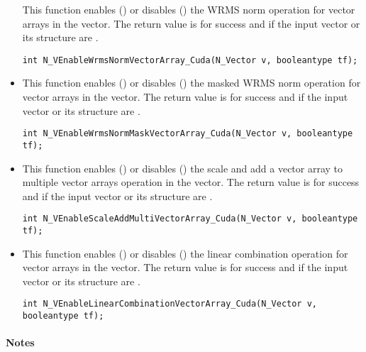 \begin{itemize}
This function enables () or disables () the WRMS norm
operation for vector arrays in the {\cuda} vector. The return value is  for
success and  if the input vector or its  structure are .

\verb|int N_VEnableWrmsNormVectorArray_Cuda(N_Vector v, booleantype tf);|


\item {}

This function enables () or disables () the masked WRMS
norm operation for vector arrays in the {\cuda} vector. The return value is
 for success and  if the input vector or its  structure are
.

\verb|int N_VEnableWrmsNormMaskVectorArray_Cuda(N_Vector v, booleantype tf);|


\item {}

This function enables () or disables () the scale and
add a vector array to multiple vector arrays operation in the {\cuda} vector. The
return value is  for success and  if the input vector or its
 structure are .

\verb|int N_VEnableScaleAddMultiVectorArray_Cuda(N_Vector v, booleantype tf);|


\item {}

This function enables () or disables () the linear
combination operation for vector arrays in the {\cuda} vector. The return value
is  for success and  if the input vector or its  structure
are .

\verb|int N_VEnableLinearCombinationVectorArray_Cuda(N_Vector v, booleantype tf);|

\end{itemize}
\paragraph{\bf Notes}


